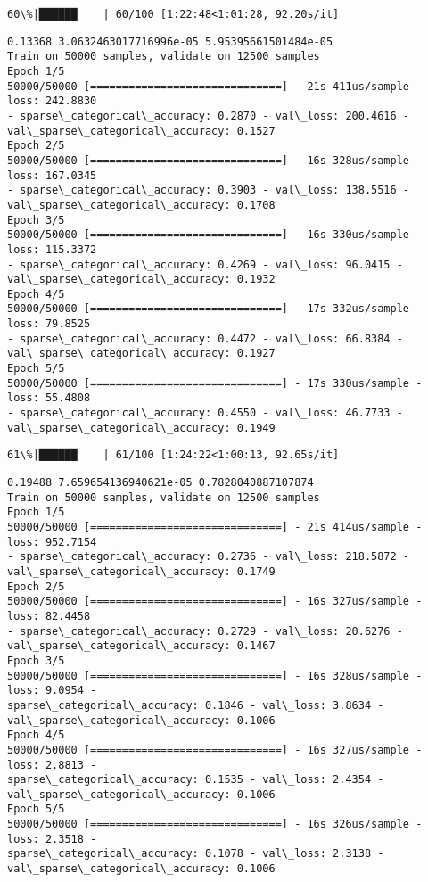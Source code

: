 \documentclass[11pt]{article}
\begin{document}
    \begin{Verbatim}[commandchars=\\\{\}]
 60\%|██████    | 60/100 [1:22:48<1:01:28, 92.20s/it]
    \end{Verbatim}

    \begin{Verbatim}[commandchars=\\\{\}]
0.13368 3.0632463017716996e-05 5.95395661501484e-05
Train on 50000 samples, validate on 12500 samples
Epoch 1/5
50000/50000 [==============================] - 21s 411us/sample - loss: 242.8830
- sparse\_categorical\_accuracy: 0.2870 - val\_loss: 200.4616 -
val\_sparse\_categorical\_accuracy: 0.1527
Epoch 2/5
50000/50000 [==============================] - 16s 328us/sample - loss: 167.0345
- sparse\_categorical\_accuracy: 0.3903 - val\_loss: 138.5516 -
val\_sparse\_categorical\_accuracy: 0.1708
Epoch 3/5
50000/50000 [==============================] - 16s 330us/sample - loss: 115.3372
- sparse\_categorical\_accuracy: 0.4269 - val\_loss: 96.0415 -
val\_sparse\_categorical\_accuracy: 0.1932
Epoch 4/5
50000/50000 [==============================] - 17s 332us/sample - loss: 79.8525
- sparse\_categorical\_accuracy: 0.4472 - val\_loss: 66.8384 -
val\_sparse\_categorical\_accuracy: 0.1927
Epoch 5/5
50000/50000 [==============================] - 17s 330us/sample - loss: 55.4808
- sparse\_categorical\_accuracy: 0.4550 - val\_loss: 46.7733 -
val\_sparse\_categorical\_accuracy: 0.1949
    \end{Verbatim}

    \begin{Verbatim}[commandchars=\\\{\}]
 61\%|██████    | 61/100 [1:24:22<1:00:13, 92.65s/it]
    \end{Verbatim}

    \begin{Verbatim}[commandchars=\\\{\}]
0.19488 7.659654136940621e-05 0.7828040887107874
Train on 50000 samples, validate on 12500 samples
Epoch 1/5
50000/50000 [==============================] - 21s 414us/sample - loss: 952.7154
- sparse\_categorical\_accuracy: 0.2736 - val\_loss: 218.5872 -
val\_sparse\_categorical\_accuracy: 0.1749
Epoch 2/5
50000/50000 [==============================] - 16s 327us/sample - loss: 82.4458
- sparse\_categorical\_accuracy: 0.2729 - val\_loss: 20.6276 -
val\_sparse\_categorical\_accuracy: 0.1467
Epoch 3/5
50000/50000 [==============================] - 16s 328us/sample - loss: 9.0954 -
sparse\_categorical\_accuracy: 0.1846 - val\_loss: 3.8634 -
val\_sparse\_categorical\_accuracy: 0.1006
Epoch 4/5
50000/50000 [==============================] - 16s 327us/sample - loss: 2.8813 -
sparse\_categorical\_accuracy: 0.1535 - val\_loss: 2.4354 -
val\_sparse\_categorical\_accuracy: 0.1006
Epoch 5/5
50000/50000 [==============================] - 16s 326us/sample - loss: 2.3518 -
sparse\_categorical\_accuracy: 0.1078 - val\_loss: 2.3138 -
val\_sparse\_categorical\_accuracy: 0.1006
    \end{Verbatim}
\end{document}
